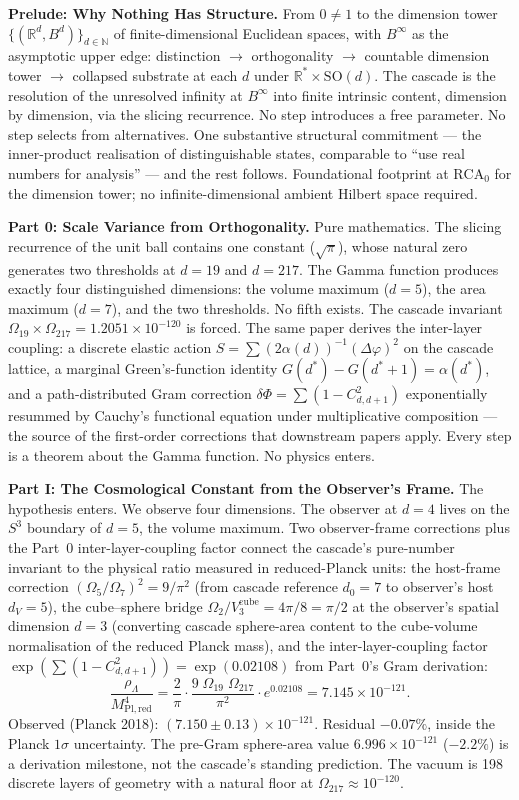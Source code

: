 \documentclass[12pt,a4paper]{article}
\begin{document}
\textbf{Prelude: Why Nothing Has Structure.} From $0\neq 1$ to the
dimension tower $\{(\mathbb{R}^d, B^d)\}_{d\in\mathbb{N}}$ of
finite-dimensional Euclidean spaces, with $B^\infty$ as the asymptotic
upper edge: distinction $\to$ orthogonality $\to$ countable dimension
tower $\to$ collapsed substrate at each $d$ under
$\mathbb{R}^*\times\mathrm{SO}(d)$. The cascade is the resolution of
the unresolved infinity at $B^\infty$ into finite intrinsic content,
dimension by dimension, via the slicing recurrence. No step introduces
a free parameter. No step selects from alternatives. One substantive
structural commitment --- the inner-product realisation of
distinguishable states, comparable to ``use real numbers for
analysis'' --- and the rest follows. Foundational footprint at
$\mathrm{RCA}_0$ for the dimension tower; no infinite-dimensional
ambient Hilbert space required.

\textbf{Part 0: Scale Variance from Orthogonality.} Pure mathematics. The slicing
recurrence of the unit ball contains one constant ($\sqrt{\pi}$), whose natural zero
generates two thresholds at $d = 19$ and $d = 217$. The Gamma function produces exactly
four distinguished dimensions: the volume maximum ($d = 5$), the area maximum ($d = 7$),
and the two thresholds. No fifth exists. The cascade invariant
$\Omega_{19}\times\Omega_{217} = 1.2051\times 10^{-120}$ is forced. The same paper
derives the inter-layer coupling: a discrete elastic action $S = \sum (2\alpha(d))^{-1}
(\Delta\varphi)^2$ on the cascade lattice, a marginal Green's-function identity
$G(d^*) - G(d^*+1) = \alpha(d^*)$, and a path-distributed Gram correction
$\delta\Phi = \sum (1 - C^2_{d,d+1})$ exponentially resummed by Cauchy's functional
equation under multiplicative composition --- the source of the first-order corrections
that downstream papers apply. Every step is a theorem about the Gamma function. No
physics enters.

\textbf{Part I: The Cosmological Constant from the Observer's Frame.} The hypothesis
enters. We observe four dimensions. The observer at $d = 4$ lives on the $S^3$ boundary
of $d = 5$, the volume maximum. Two observer-frame corrections plus the Part~0
inter-layer-coupling factor connect the cascade's pure-number invariant to the physical
ratio measured in reduced-Planck units: the host-frame correction
$(\Omega_5/\Omega_7)^2 = 9/\pi^2$ (from cascade reference $d_0 = 7$ to observer's host
$d_V = 5$), the cube--sphere bridge
$\Omega_2/V_3^{\mathrm{cube}} = 4\pi/8 = \pi/2$ at the observer's spatial dimension
$d = 3$ (converting cascade sphere-area content to the cube-volume normalisation of
the reduced Planck mass), and the inter-layer-coupling factor
$\exp(\sum(1-C^2_{d,d+1}))=\exp(0.02108)$ from Part~0's Gram derivation:
\[
\frac{\rho_\Lambda}{M^4_{\mathrm{Pl,red}}}
= \frac{2}{\pi}\cdot\frac{9\;\Omega_{19}\;\Omega_{217}}{\pi^2}\cdot e^{0.02108}
= 7.145\times 10^{-121}.
\]
Observed (Planck 2018): $(7.150\pm 0.13)\times 10^{-121}$. Residual $-0.07\%$, inside
the Planck $1\sigma$ uncertainty. The pre-Gram sphere-area value $6.996\times 10^{-121}$
($-2.2\%$) is a derivation milestone, not the cascade's standing prediction. The vacuum
is 198 discrete layers of geometry with a natural floor at $\Omega_{217}\approx 10^{-120}$.
\end{document}

